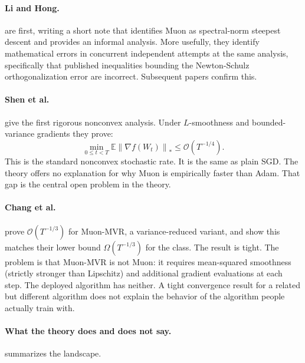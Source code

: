 \documentclass[11pt]{article}
\newcommand{\E}{\mathbb{E}}
\newcommand{\norm}[1]{\left\|#1\right\|}
\begin{document}
\paragraph{Li and Hong.}
\citet{li2025note} are first, writing a short note that identifies Muon as spectral-norm steepest descent and provides an informal analysis. More usefully, they identify mathematical errors in concurrent independent attempts at the same analysis, specifically that published inequalities bounding the Newton-Schulz orthogonalization error are incorrect. Subsequent papers \citep{chang2025beyond} confirm this.

\paragraph{Shen et al.}
\citet{shen2025convergence} give the first rigorous nonconvex analysis. Under $L$-smoothness and bounded-variance gradients they prove:
\begin{equation}
\min_{0\le t<T}\E\norm{\nabla f(W_t)}_*\le\mathcal{O}(T^{-1/4}).
\end{equation}
This is the standard nonconvex stochastic rate. It is the same as plain SGD. The theory offers no explanation for why Muon is empirically faster than Adam. That gap is the central open problem in the theory.

\paragraph{Chang et al.}
\citet{chang2025beyond} prove $\mathcal{O}(T^{-1/3})$ for Muon-MVR, a variance-reduced variant, and show this matches their lower bound $\Omega(T^{-1/3})$ for the class. The result is tight. The problem is that Muon-MVR is not Muon: it requires mean-squared smoothness (strictly stronger than Lipschitz) and additional gradient evaluations at each step. The deployed algorithm has neither. A tight convergence result for a related but different algorithm does not explain the behavior of the algorithm people actually train with.

\paragraph{What the theory does and does not say.}
 summarizes the landscape.
\end{document}
